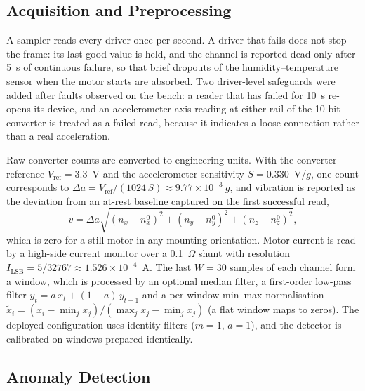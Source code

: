 \documentclass[11pt,a4paper]{article}
\begin{document}
\subsection{Acquisition and Preprocessing}

A sampler reads every driver once per second. A driver that fails does not stop the frame: its last good value is held, and the channel is reported dead only after 5~s of continuous failure, so that brief dropouts of the humidity--temperature sensor when the motor starts are absorbed. Two driver-level safeguards were added after faults observed on the bench: a reader that has failed for 10~s re-opens its device, and an accelerometer axis reading at either rail of the 10-bit converter is treated as a failed read, because it indicates a loose connection rather than a real acceleration.

Raw converter counts are converted to engineering units. With the converter reference $V_{\mathrm{ref}} = 3.3$~V and the accelerometer sensitivity $S = 0.330$~V/$g$, one count corresponds to $\Delta a = V_{\mathrm{ref}} / (1024\, S) \approx 9.77 \times 10^{-3}~g$, and vibration is reported as the deviation from an at-rest baseline captured on the first successful read,
\begin{equation}
v = \Delta a \sqrt{(n_x - n_x^0)^2 + (n_y - n_y^0)^2 + (n_z - n_z^0)^2},
\end{equation}
which is zero for a still motor in any mounting orientation. Motor current is read by a high-side current monitor over a 0.1~$\Omega$ shunt with resolution $I_{\mathrm{LSB}} = 5/32767 \approx 1.526 \times 10^{-4}$~A. The last $W = 30$ samples of each channel form a window, which is processed by an optional median filter, a first-order low-pass filter $y_t = a\,x_t + (1-a)\,y_{t-1}$ and a per-window min--max normalisation $\tilde{x}_i = (x_i - \min_j x_j)/(\max_j x_j - \min_j x_j)$ (a flat window maps to zeros). The deployed configuration uses identity filters ($m = 1$, $a = 1$), and the detector is calibrated on windows prepared identically.

\subsection{Anomaly Detection}
\end{document}
